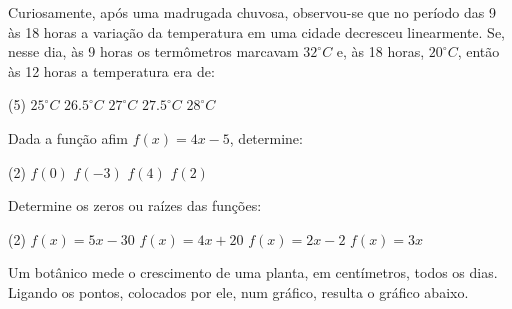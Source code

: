 \documentclass[a4paper,11pt,addpoints]{exam}
\begin{document}
\begin{questions}

    \question[1]

    Curiosamente, após uma madrugada chuvosa, observou-se que no período das 9
    às 18 horas a variação da temperatura em uma cidade decresceu linearmente.
    Se, nesse dia, às 9 horas os termômetros marcavam $32^\circ C$ e, às 18
    horas, $20^\circ C$, então às 12 horas a temperatura era de:

    \begin{tasks}(5)
        \task $25^\circ C$
        \task $26.5^\circ C$
        \task $27^\circ C$
        \task $27.5^\circ C$
        \task $28^\circ C$
    \end{tasks}

    \question[1]

    Dada a função afim $f(x) = 4x -5$, determine:

    \begin{tasks}(2)
        \task $f(0)$
        \task $f(-3)$
        \task $f(4)$
        \task $f(2)$
    \end{tasks}

    \question[1]

    Determine os zeros ou raízes das funções:

    \begin{tasks}(2)
        \task $f(x) = 5x - 30$
        \task $f(x) = 4x + 20$
        \task $f(x) = 2x - 2$
        \task $f(x) = 3x$
    \end{tasks}

    \question[1]

    Um botânico mede o crescimento de uma planta, em centímetros, todos os dias.
    Ligando os pontos, colocados por ele, num gráfico, resulta o gráfico abaixo.

    \begin{center}
    \end{center}


\end{questions}
\end{document}

